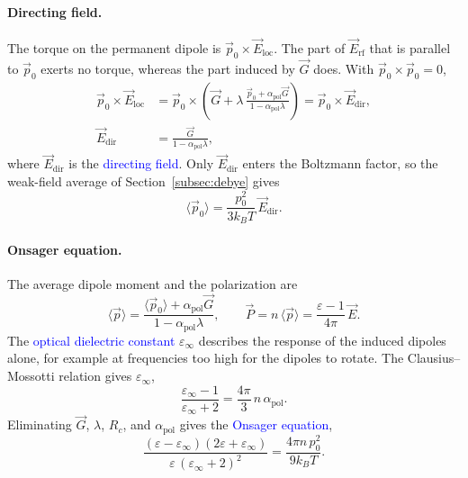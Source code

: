 \paragraph{Directing field.}
The torque on the permanent dipole is $\vec p_0\times\vec E_{\text{loc}}$. The part of $\vec E_{\text{rf}}$ that is parallel to $\vec p_0$ exerts no torque, whereas the part induced by $\vec G$ does. With $\vec p_0\times\vec p_0 = 0$,
\begin{align*}
    \vec p_0\times\vec E_{\text{loc}}
    &= \vec p_0\times\left(\vec G + \lambda\,\frac{\vec p_0 + \alpha_{\text{pol}}\vec G}{1 - \alpha_{\text{pol}}\lambda}\right)
    = \vec p_0\times\vec E_{\text{dir}},\\
    \vec E_{\text{dir}} &= \frac{\vec G}{1 - \alpha_{\text{pol}}\lambda},
\end{align*}
where $\vec E_{\text{dir}}$ is the \textcolor{blue}{directing field}. Only $\vec E_{\text{dir}}$ enters the Boltzmann factor, so the weak-field average of Section~\ref{subsec:debye} gives
\begin{equation*}
    \langle\vec p_0\rangle = \frac{p_0^2}{3k_BT}\,\vec E_{\text{dir}}.
\end{equation*}

\paragraph{Onsager equation.}
The average dipole moment and the polarization are
\begin{equation*}
    \langle\vec p\rangle = \frac{\langle\vec p_0\rangle + \alpha_{\text{pol}}\vec G}{1 - \alpha_{\text{pol}}\lambda},
    \qquad
    \vec P = n\,\langle\vec p\rangle = \frac{\varepsilon - 1}{4\pi}\,\vec E.
\end{equation*}
The \textcolor{blue}{optical dielectric constant} $\varepsilon_\infty$ describes the response of the induced dipoles alone, for example at frequencies too high for the dipoles to rotate. The Clausius--Mossotti relation gives $\varepsilon_\infty$,
\begin{equation*}
    \frac{\varepsilon_\infty - 1}{\varepsilon_\infty + 2} = \frac{4\pi}{3}\,n\,\alpha_{\text{pol}}.
\end{equation*}
Eliminating $\vec G$, $\lambda$, $R_c$, and $\alpha_{\text{pol}}$ gives the \textcolor{blue}{Onsager equation},
\begin{equation}
    \boxed{
    \frac{(\varepsilon - \varepsilon_\infty)(2\varepsilon + \varepsilon_\infty)}{\varepsilon\,(\varepsilon_\infty + 2)^2} = \frac{4\pi n\,p_0^2}{9k_BT}.
    }
\end{equation}


